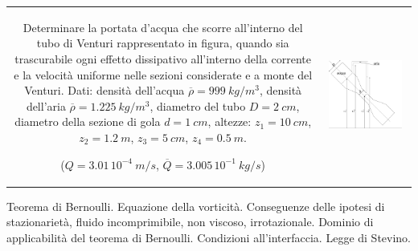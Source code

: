 \noindent
\begin{tabular}{cc}
\begin{minipage}[b]{0.60\textwidth}
\begin{exerciseS}[Venturi]
Determinare la portata d'acqua che scorre all'interno del tubo di Venturi 
rappresentato in figura, quando sia trascurabile ogni effetto dissipativo 
all'interno della corrente e la velocit\`{a} uniforme nelle sezioni considerate e
a monte del Venturi.
Dati: densit\`{a} dell'acqua $\overline{\rho}= 999\ kg/m^3$, 
densit\`{a} dell'aria $\overline{\rho}= 1.225\ kg/m^3$,
diametro del tubo $D=2\  cm$, diametro della sezione di gola
$d=1\ cm $, altezze: $z_1 = 10\ cm $, $z_2 = 1.2\  m $,
$z_3 = 5\ cm $, $z_4 = 0.5\ m $.

($Q=3.01\, 10^{-4}\ m/s$, $\overline{Q}=3.005\, 10^{-1}\ kg/s$)
\end{exerciseS}
\end{minipage}
&
\begin{minipage}{0.35\textwidth}
   \begin{center}
   \includegraphics[width=0.90\textwidth]{./fig/venturi.eps}
   \end{center}
\end{minipage}
\end{tabular}

\sol

\partone
Teorema di Bernoulli. Equazione della vorticità. Conseguenze delle ipotesi di stazionarietà, fluido incomprimibile, non viscoso, irrotazionale. Dominio di applicabilità del teorema di Bernoulli. Condizioni all'interfaccia.
Legge di Stevino.

